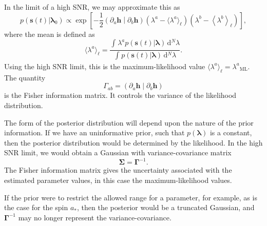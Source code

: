 \documentclass[useAMS,usedcolumn,usegraphicx,usenatbib]{mn2e}
\newcommand{\sub}[1]{\ensuremath{_\mathrm{#1}}}
\newcommand{\dd}{\ensuremath{\mathrm{d}}}
\newcommand{\intd}[4]{\ensuremath{\int_{#1}^{#2}{#3}\,\dd{#4}}}
\newcommand{\recip}[1]{\ensuremath{\frac{1}{#1}}}
\newcommand{\innerprod}[2]{\ensuremath{\left({#1}\middle|{#2}\right)}}
\begin{document}
In the limit of a high SNR, we may approximate this as \citep{Vallisneri2008}
\begin{equation}
p(\boldsymbol{s}(t)|\boldsymbol{\lambda}_0) \propto \exp\left[-\recip{2}\innerprod{\partial_a\boldsymbol{h}}{\partial_b\boldsymbol{h}}\left(\lambda^a - \langle\lambda^a\rangle_\ell\right)\left(\lambda^b - \left\langle\lambda^b\right\rangle_\ell\right)\right],
\end{equation}
where the mean is defined as
\begin{equation}
\langle\lambda^a\rangle_\ell = \frac{\intd{}{}{\lambda^a p(\boldsymbol{s}(t)|\boldsymbol{\lambda})}{^N \lambda}}{\intd{}{}{p(\boldsymbol{s}(t)|\boldsymbol{\lambda})}{^N \lambda}}.
\end{equation}
Using the high SNR limit, this is the maximum-likelihood value $\langle\lambda^a\rangle_\ell = \lambda^a\sub{ML}$. The quantity
\begin{equation}
\Gamma_{ab} = \innerprod{\partial_a\boldsymbol{h}}{\partial_b\boldsymbol{h}}
\label{eq:Fisher}
\end{equation}
is the Fisher information matrix. It controls the variance of the likelihood distribution.

The form of the posterior distribution will depend upon the nature of the prior information. If we have an uninformative prior, such that $p(\boldsymbol{\lambda})$ is a constant, then the posterior distribution would be determined by the likelihood. In the high SNR limit, we would obtain a Gaussian with variance-covariance matrix
\begin{equation}
\boldsymbol{\Sigma} = \boldsymbol{\Gamma}^{-1}.
\label{eq:InvFisher}
\end{equation}
The Fisher information matrix gives the uncertainty associated with the estimated parameter values, in this case the maximum-likelihood values.

If the prior were to restrict the allowed range for a parameter, for example, as is the case for the spin $a_\ast$, then the posterior would be a truncated Gaussian, and $\boldsymbol{\Gamma}^{-1}$ may no longer represent the variance-covariance.
\end{document}
